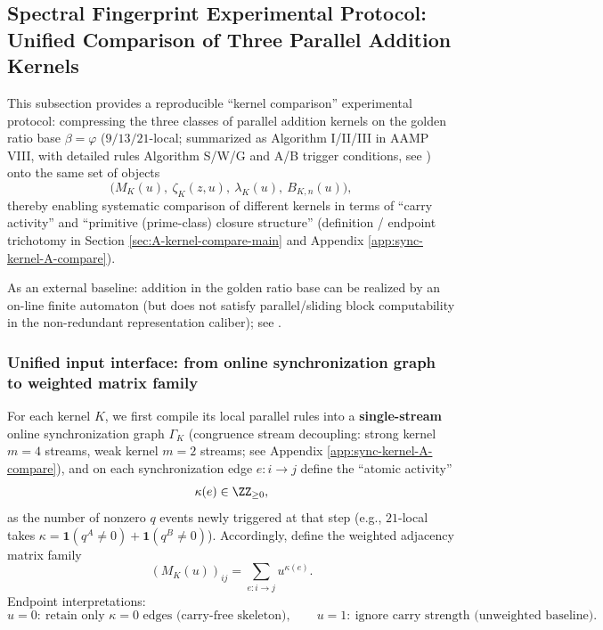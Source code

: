 \subsection{Spectral Fingerprint Experimental Protocol: Unified Comparison of Three Parallel Addition Kernels}\label{sec:exp-kernel-fingerprint}
This subsection provides a reproducible ``kernel comparison'' experimental protocol: compressing the three classes of parallel addition kernels on the golden ratio base $\beta=\varphi$ ($9/13/21$-local; summarized as Algorithm I/II/III in AAMP VIII, with detailed rules Algorithm S/W/G and A/B trigger conditions, see \cite{SvobodovaAAMPVIIIParallelAddition,FrougnyHellerPelantovaSvobodovaParallelAlgorithmsSlides}) onto the same set of objects
\[
\bigl(M_K(u),\ \zeta_K(z,u),\ \lambda_K(u),\ B_{K,n}(u)\bigr),
\]
thereby enabling systematic comparison of different kernels in terms of ``carry activity'' and ``primitive (prime-class) closure structure'' (definition / endpoint trichotomy in Section \ref{sec:A-kernel-compare-main} and Appendix \ref{app:sync-kernel-A-compare}).
\par
As an external baseline: addition in the golden ratio base can be realized by an on-line finite automaton (but does not satisfy parallel/sliding block computability in the non-redundant representation caliber); see \cite{Frougny1999OnlineAddition}.

\subsubsection{Unified input interface: from online synchronization graph to weighted matrix family}
For each kernel $K$, we first compile its local parallel rules into a \textbf{single-stream} online synchronization graph $\Gamma_K$ (congruence stream decoupling: strong kernel $m=4$ streams, weak kernel $m=2$ streams; see Appendix \ref{app:sync-kernel-A-compare}), and on each synchronization edge $e:i\to j$ define the ``atomic activity''
\[
\kappa(e)\in\ZZ_{\ge 0},
\]
as the number of nonzero $q$ events newly triggered at that step (e.g., $21$-local takes $\kappa=\mathbf{1}(q^A\neq 0)+\mathbf{1}(q^B\neq 0)$).
Accordingly, define the weighted adjacency matrix family
\[
(M_K(u))_{ij}=\sum_{e:i\to j}u^{\kappa(e)}.
\]
Endpoint interpretations:
\[
u=0:\ \text{retain only $\kappa=0$ edges (carry-free skeleton)},\qquad
u=1:\ \text{ignore carry strength (unweighted baseline)}.
\]

